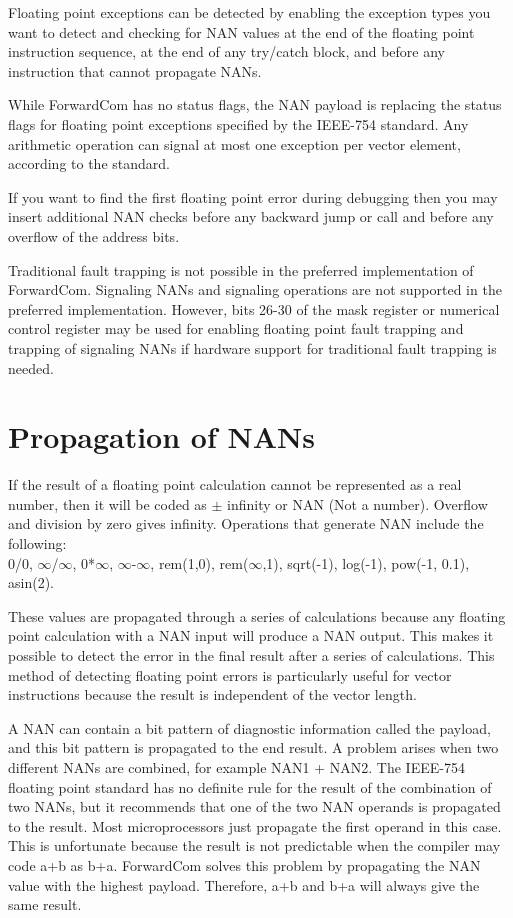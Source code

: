 \documentclass[forwardcom.tex]{subfiles}
\begin{document}
Floating point exceptions can be detected by enabling the exception types you want to detect and checking for NAN values at the end of the floating point instruction sequence, at the end of any 
try/catch block, and before any instruction that cannot propagate NANs. 
\vv 

While ForwardCom has no status flags, the NAN payload is replacing the 
status flags for floating point exceptions specified by the IEEE-754 standard. 
Any arithmetic operation can signal at most one exception per vector element, according to the standard.
\vv 

If you want to find the first floating point error during debugging then you may insert additional NAN checks before any backward jump or call and before any overflow of the address bits.
\vv

Traditional fault trapping is not possible in the preferred implementation of ForwardCom. Signaling NANs and signaling operations are not supported in the preferred implementation. 
However, bits 26-30 of the mask register or numerical control register may be used for enabling floating point fault trapping and trapping of signaling NANs if hardware support for traditional fault trapping is needed.
\vv


\section{Propagation of NANs}
\label{nanPropagation}
If the result of a floating point calculation cannot be represented as a real number, then it will be coded as $\pm$ infinity or NAN (Not a number). Overflow and division by zero gives infinity.
Operations that generate NAN include the following:\\
0/0, $\infty$/$\infty$, 0*$\infty$, $\infty$-$\infty$, rem(1,0), rem($\infty$,1), sqrt(-1), log(-1), pow(-1, 0.1), asin(2).
\vv

These values are propagated through a series of calculations because any floating point calculation with a NAN input will produce a NAN output. This makes it possible to detect the error in the final result after a series of calculations. This method of detecting floating point errors is particularly useful for vector instructions because the result is independent of the vector length.
\vv

A NAN can contain a bit pattern of diagnostic information called the payload, and this bit pattern is propagated to the end result. A problem arises when two different NANs are combined, for example NAN1 + NAN2. The IEEE-754 floating point standard  has no definite rule for the result of the combination of two NANs, but it recommends that one of the two NAN operands is propagated to the result. Most microprocessors just propagate the first operand in this case. This is unfortunate because the result is not predictable when the compiler may code a+b as b+a. ForwardCom solves this problem by propagating the NAN value with the highest payload. Therefore, a+b and b+a will always give the same result.
\vv
\end{document}
